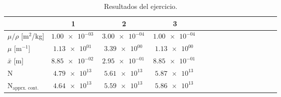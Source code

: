 \begin{table}
\caption{Resultados del ejercicio.}
\begin{tabular}{lcccccccccccccc}
\toprule
 & 1 & 2 & 3 \\
\midrule
$\mu/\rho$ [m$^2$/kg] & $\SI{1.00e-03}{}$ & $\SI{3.00e-04}{}$ & $\SI{1.00e-04}{}$ \\
$\mu$ [m$^{-1}$] & $\SI{1.13e+01}{}$ & $\SI{3.39e+00}{}$ & $\SI{1.13e+00}{}$ \\
$\bar{x}$ [m] & $\SI{8.85e-02}{}$ & $\SI{2.95e-01}{}$ & $\SI{8.85e-01}{}$ \\
N & $\SI{4.79e+13}{}$ & $\SI{5.61e+13}{}$ & $\SI{5.87e+13}{}$ \\
N$_{\text{apprx. cont.}}$ & $\SI{4.64e+13}{}$ & $\SI{5.59e+13}{}$ & $\SI{5.86e+13}{}$ \\
\bottomrule
\end{tabular}
\end{table}
